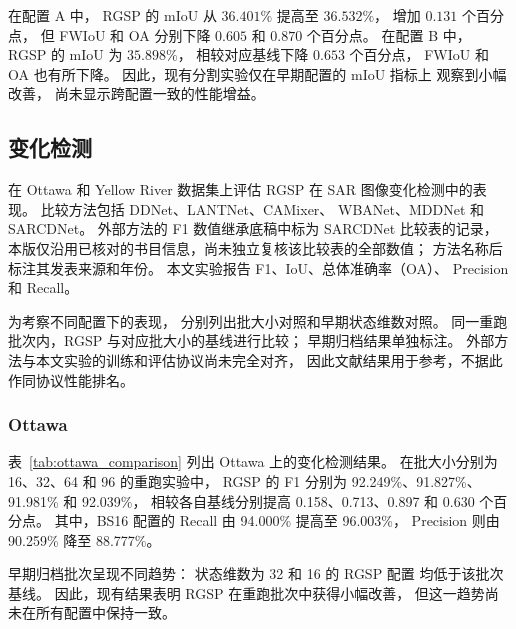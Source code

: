 \documentclass[journal]{IEEEtran}
\begin{document}
在配置 A 中，
RGSP 的 mIoU 从 $36.401\%$ 提高至 $36.532\%$，
增加 $0.131$ 个百分点，
但 FWIoU 和 OA 分别下降
$0.605$ 和 $0.870$ 个百分点。
在配置 B 中，
RGSP 的 mIoU 为 $35.898\%$，
相较对应基线下降 $0.653$ 个百分点，
FWIoU 和 OA 也有所下降。
因此，现有分割实验仅在早期配置的 mIoU 指标上
观察到小幅改善，
尚未显示跨配置一致的性能增益。
\subsection{变化检测}
\label{sec:change_detection_results}

在 Ottawa 和 Yellow River 数据集上评估 RGSP
在 SAR 图像变化检测中的表现。
比较方法包括 DDNet、LANTNet、CAMixer、
WBANet、MDDNet 和 SARCDNet。
外部方法的 F1 数值继承底稿中标为 SARCDNet 比较表的记录\cite{sarcdnet2026}，
本版仅沿用已核对的书目信息，尚未独立复核该比较表的全部数值；
方法名称后标注其发表来源和年份。
本文实验报告 F1、IoU、总体准确率（OA）、
Precision 和 Recall。

为考察不同配置下的表现，
分别列出批大小对照和早期状态维数对照。
同一重跑批次内，RGSP 与对应批大小的基线进行比较；
早期归档结果单独标注。
外部方法与本文实验的训练和评估协议尚未完全对齐，
因此文献结果用于参考，不据此作同协议性能排名。

\subsubsection{Ottawa}
\label{sec:ottawa_results}

表~\ref{tab:ottawa_comparison}
列出 Ottawa 上的变化检测结果。
在批大小分别为 16、32、64 和 96 的重跑实验中，
RGSP 的 F1 分别为
92.249\%、91.827\%、91.981\% 和 92.039\%，
相较各自基线分别提高
0.158、0.713、0.897 和 0.630 个百分点。
其中，BS16 配置的 Recall
由 94.000\% 提高至 96.003\%，
Precision 则由 90.259\% 降至 88.777\%。

早期归档批次呈现不同趋势：
状态维数为 32 和 16 的 RGSP 配置
均低于该批次基线。
因此，现有结果表明 RGSP 在重跑批次中获得小幅改善，
但这一趋势尚未在所有配置中保持一致。
\end{document}
